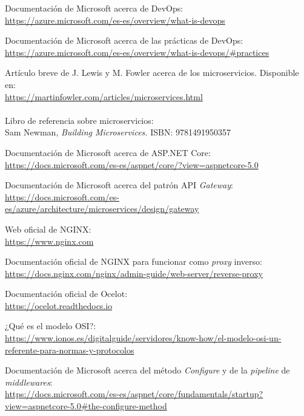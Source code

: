 \documentclass[11pt,spanish,listoffigures]{tfgetsinf}
\begin{document}
\begin{thebibliography}{10}

Documentación de Microsoft acerca de DevOps:\\
\url{https://azure.microsoft.com/es-es/overview/what-is-devops}

Documentación de Microsoft acerca de las prácticas de DevOps:\\
\url{https://azure.microsoft.com/es-es/overview/what-is-devops/#practices}

Artículo breve de J. Lewis y M. Fowler acerca de los microservicios.
\newblock Disponible en:\\
\url{https://martinfowler.com/articles/microservices.html}\\\\
\newblock Libro de referencia sobre microservicios:\\
\newblock Sam Newman,
\newblock \emph{Building Microservices.}
\newblock ISBN: 9781491950357

Documentación de Microsoft acerca de ASP.NET Core:\\
\url{https://docs.microsoft.com/es-es/aspnet/core/?view=aspnetcore-5.0}

Documentación de Microsoft acerca del patrón API \emph{Gateway}:\\
\url{https://docs.microsoft.com/es-es/azure/architecture/microservices/design/gateway}

Web oficial de NGINX:\\
\url{https://www.nginx.com}

Documentación oficial de NGINX para funcionar como \emph{proxy} inverso:\\
\url{https://docs.nginx.com/nginx/admin-guide/web-server/reverse-proxy}

Documentación oficial de Ocelot:\\
\url{https://ocelot.readthedocs.io}

¿Qué es el modelo OSI?:\\
\url{https://www.ionos.es/digitalguide/servidores/know-how/el-modelo-osi-un-referente-para-normas-y-protocolos}

Documentación de Microsoft acerca del método \emph{Configure} y de la \emph{pipeline} de \emph{middlewares}:\\
\url{https://docs.microsoft.com/es-es/aspnet/core/fundamentals/startup?view=aspnetcore-5.0#the-configure-method}


\end{thebibliography}
\end{document}
